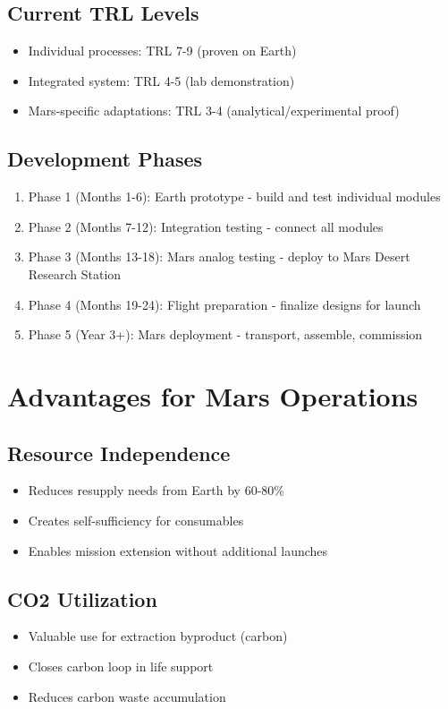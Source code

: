 \documentclass[12pt, a4paper]{article}
\begin{document}
\subsection{Current TRL Levels}
\begin{itemize}
    \item Individual processes: TRL 7-9 (proven on Earth)
    \item Integrated system: TRL 4-5 (lab demonstration)
    \item Mars-specific adaptations: TRL 3-4 (analytical/experimental proof)
\end{itemize}

\subsection{Development Phases}
\begin{enumerate}
    \item Phase 1 (Months 1-6): Earth prototype - build and test individual modules
    \item Phase 2 (Months 7-12): Integration testing - connect all modules
    \item Phase 3 (Months 13-18): Mars analog testing - deploy to Mars Desert Research Station
    \item Phase 4 (Months 19-24): Flight preparation - finalize designs for launch
    \item Phase 5 (Year 3+): Mars deployment - transport, assemble, commission
\end{enumerate}

\section{Advantages for Mars Operations}

\subsection{Resource Independence}
\begin{itemize}
    \item Reduces resupply needs from Earth by 60-80\%
    \item Creates self-sufficiency for consumables
    \item Enables mission extension without additional launches
\end{itemize}

\subsection{CO2 Utilization}
\begin{itemize}
    \item Valuable use for extraction byproduct (carbon)
    \item Closes carbon loop in life support
    \item Reduces carbon waste accumulation
\end{itemize}
\end{document}
